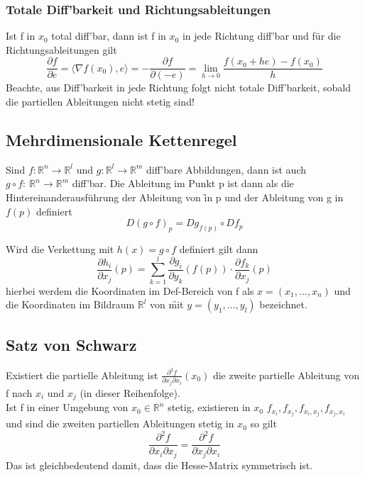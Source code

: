 \subsubsection{Totale Diff'barkeit und Richtungsableitungen}
Ist f in $x_0$ total diff'bar, dann ist f in $x_0$ in jede Richtung diff'bar und für die Richtungsableitungen gilt 
\begin{equation}
    \frac{\partial f}{\partial e} = \langle \nabla f(x_0),e\rangle = - \frac{\partial f}{\partial (-e)} = \lim_{h\to 0}\frac{f(x_0+he)-f(x_0)}{h}
\end{equation}
Beachte, aus Diff'barkeit in jede Richtung folgt nicht totale Diff'barkeit, sobald die partiellen Ableitungen nicht stetig sind!

\subsection{Mehrdimensionale Kettenregel}
Sind $f:\mathbb{R}^n\to \mathbb{R}^l$ und $g:\mathbb{R}^l\to \mathbb{R}^m$ diff'bare Abbildungen, dann ist auch $g\circ f: \ \mathbb{R}^n\to \mathbb{R}^m$ diff'bar. Die Ableitung im Punkt p ist dann als die Hintereinanderausführung der Ableitung von \f in p und der Ableitung von g in $f(p)$ definiert
\begin{equation}
    D(g\circ f)_p = Dg_{f(p)}\circ Df_p
\end{equation}

\noindent Wird die Verkettung mit $h(x)= g\circ f$ definiert gilt dann 
\begin{equation}
    \frac{\partial h_i}{\partial x_j}(p) = \sum_{k=1}^{l} \frac{\partial g_i}{\partial y_k}(f(p)) \cdot \frac{\partial f_k}{\partial x_j}(p)
\end{equation}
hierbei werdem die Koordinaten im Def-Bereich von f als $x=(x_1,\dots,x_n)$ und die Koordinaten im Bildraum $\mathbb{R}^l$ von \f mit $y=(y_1,\dots,y_l)$ bezeichnet.

\subsection{Satz von Schwarz}
Existiert die partielle Ableitung ist $\frac{\partial^2 f}{\partial x_j \partial x_i}(x_0)$ die zweite partielle Ableitung von f nach $x_i$ und $x_j$ (in dieser Reihenfolge).\\

Ist f in einer Umgebung von $x_0 \in \mathbb{R}^n$ stetig, existieren in $x_0$ $f_{x_i},f_{x_j},f_{x_i,x_j},f_{x_j,x_i}$ und sind die zweiten partiellen Ableitungen stetig in $x_0$ so gilt
\begin{equation}
    \frac{\partial^2 f}{\partial x_i \partial x_j} = \frac{\partial^2 f}{\partial x_j \partial x_i}
\end{equation}
Das ist gleichbedeutend damit, dass die Hesse-Matrix symmetrisch ist.

